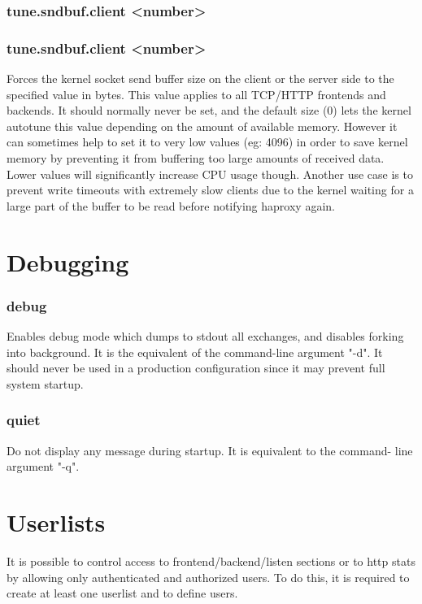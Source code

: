 \subsubsection[tune.sndbuf.client]{tune.sndbuf.client <number>}
\subsubsection[tune.sndbuf.server]{tune.sndbuf.client <number>}
  Forces the kernel socket send buffer size on the client or the server side to
  the specified value in bytes. This value applies to all TCP/HTTP frontends
  and backends. It should normally never be set, and the default size (0) lets
  the kernel autotune this value depending on the amount of available memory.
  However it can sometimes help to set it to very low values (eg: 4096) in
  order to save kernel memory by preventing it from buffering too large amounts
  of received data. Lower values will significantly increase CPU usage though.
  Another use case is to prevent write timeouts with extremely slow clients due
  to the kernel waiting for a large part of the buffer to be read before
  notifying haproxy again.

\section{Debugging}

\subsubsection[debug]{debug}
  Enables debug mode which dumps to stdout all exchanges, and disables forking
  into background. It is the equivalent of the command-line argument "-d". It
  should never be used in a production configuration since it may prevent full
  system startup.

\subsubsection[quiet]{quiet}
  Do not display any message during startup. It is equivalent to the command-
  line argument "-q".

\section{Userlists}
It is possible to control access to frontend/backend/listen sections or to
http stats by allowing only authenticated and authorized users. To do this,
it is required to create at least one userlist and to define users.

